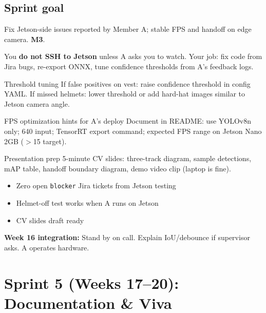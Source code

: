 \documentclass[12pt,a4paper]{report}
\begin{document}
\section{Sprint goal}

Fix Jetson-side issues reported by Member A; stable FPS and handoff on edge camera. \textbf{M3}.

\begin{approachbox}
You \textbf{do not SSH to Jetson} unless A asks you to watch. Your job: fix code from Jira bugs, re-export ONNX, tune confidence thresholds from A's feedback logs.
\end{approachbox}

\begin{stepbox}{Threshold tuning}
If false positives on vest: raise confidence threshold in config YAML. If missed helmets: lower threshold or add hard-hat images similar to Jetson camera angle.
\end{stepbox}

\begin{stepbox}{FPS optimization hints for A's deploy}
Document in README: use YOLOv8n only; 640 input; TensorRT export command; expected FPS range on Jetson Nano 2GB ($>$15 target).
\end{stepbox}

\begin{stepbox}{Presentation prep}
5-minute CV slides: three-track diagram, sample detections, mAP table, handoff boundary diagram, demo video clip (laptop is fine).
\end{stepbox}

\begin{verifybox}
\begin{itemize}
    \item[$\square$] Zero open \texttt{blocker} Jira tickets from Jetson testing
    \item[$\square$] Helmet-off test works when A runs on Jetson
    \item[$\square$] CV slides draft ready
\end{itemize}
\end{verifybox}

\begin{collabbox}
\textbf{Week 16 integration:} Stand by on call. Explain IoU/debounce if supervisor asks. A operates hardware.
\end{collabbox}

\chapter{Sprint 5 (Weeks 17--20): Documentation \& Viva}
\end{document}
